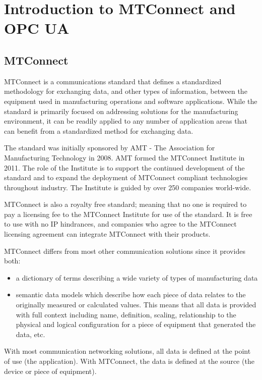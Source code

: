 \section{Introduction to MTConnect and OPC UA}

\subsection{MTConnect}

MTConnect is a communications standard that defines a standardized methodology for exchanging data, and other types of information, between the equipment used in manufacturing operations and software applications.  While the standard is primarily focused on addressing solutions for the manufacturing environment, it can be readily applied to any number of application areas that can benefit from a standardized method for exchanging data. 
   
The standard was initially sponsored by AMT - The Association for Manufacturing Technology in 2008.  AMT formed the MTConnect Institute in 2011.   The role of the Institute is to support the continued development of the standard and to expand the deployment of MTConnect compliant technologies throughout industry.   The Institute is guided by over 250 companies world-wide.  

MTConnect is also a royalty free standard; meaning that no one is required to pay a licensing fee to the MTConnect Institute for use of the standard.  It is free to use with no IP hindrances, and companies who agree to the MTConnect licensing agreement can integrate MTConnect with their products. 

MTConnect differs from most other communication solutions since it provides both:
\begin{itemize}
    \item a dictionary of terms describing a wide variety of types of manufacturing data

    \item semantic data models which describe how each piece of data relates to the originally measured or calculated values. This means that all data is provided with full context including name, definition, scaling, relationship to the physical and logical configuration for a piece of equipment that generated the data, etc.
\end{itemize}

With most communication networking solutions, all data is defined at the point of use (the application).  With MTConnect, the data is defined at the source (the device or piece of equipment). 

